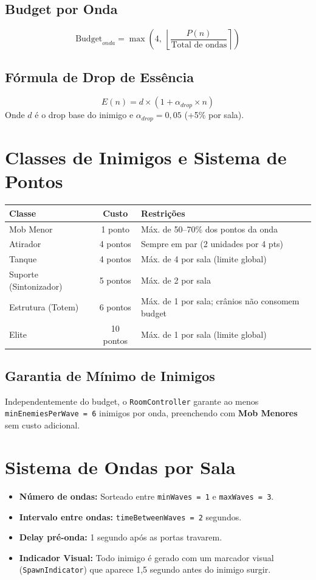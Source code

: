 \documentclass[a4paper,12pt]{report}
\begin{document}
\subsection{Budget por Onda}
\[
\text{Budget}_{onda} = \max\!\left(4,\ \left\lfloor \frac{P(n)}{\text{Total de ondas}} \right\rceil \right)
\]

\subsection{Fórmula de Drop de Essência}
\[
E(n) = d \times (1 + \alpha_{drop} \times n)
\]
Onde $d$ é o drop base do inimigo e $\alpha_{drop} = 0{,}05$ (+5\% por sala).

\section{Classes de Inimigos e Sistema de Pontos}
\begin{center}
\begin{tabular}{|l|c|l|}
    \hline
    \textbf{Classe} & \textbf{Custo} & \textbf{Restrições} \\
    \hline
    Mob Menor              & 1 ponto   & Máx. de 50--70\% dos pontos da onda \\
    Atirador               & 4 pontos  & Sempre em par (2 unidades por 4 pts) \\
    Tanque                 & 4 pontos  & Máx. de 4 por sala (limite global) \\
    Suporte (Sintonizador) & 5 pontos  & Máx. de 2 por sala \\
    Estrutura (Totem)      & 6 pontos  & Máx. de 1 por sala; crânios não consomem budget \\
    Elite                  & 10 pontos & Máx. de 1 por sala (limite global) \\
    \hline
\end{tabular}
\end{center}

\subsection{Garantia de Mínimo de Inimigos}
Independentemente do budget, o \texttt{RoomController} garante ao menos \texttt{minEnemiesPerWave = 6} inimigos por onda, preenchendo com \textbf{Mob Menores} sem custo adicional.

\section{Sistema de Ondas por Sala}
\begin{itemize}
    \item \textbf{Número de ondas:} Sorteado entre \texttt{minWaves = 1} e \texttt{maxWaves = 3}.
    \item \textbf{Intervalo entre ondas:} \texttt{timeBetweenWaves = 2} segundos.
    \item \textbf{Delay pré-onda:} 1 segundo após as portas travarem.
    \item \textbf{Indicador Visual:} Todo inimigo é gerado com um marcador visual (\texttt{SpawnIndicator}) que aparece 1,5 segundo antes do inimigo surgir.
\end{itemize}
\end{document}

